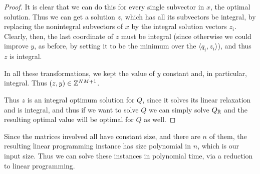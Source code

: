 \begin{proof}
It is clear that we can do this for every single subvector in $x$, the optimal solution. Thus we can get a solution $z$, which has all its subvectors be integral, by replacing the nonintegral subvectors of $x$ by the integral solution vectors $z_i$. Clearly, then, the last coordinate of $z$ must be integral (since otherwise we could improve $y$, as before, by setting it to be the minimum over the $\langle q_i, z_i \rangle$), and thus $z$ is integral.

In all these transformations, we kept the value of $y$ constant and, in particular, integral. Thus $(z, y) \in \mathbb{Z}^{NM+1}$.

Thus $z$ is an integral optimum solution for $Q$, since it solves its linear relaxation and is integral, and thus if we want to solve $Q$ we can simply solve $Q_{\mathbb{R}}$ and the resulting optimal value will be optimal for $Q$ as well.
\end{proof}

Since the matrices involved all have constant size, and there are $n$ of them, the resulting linear programming instance has size polynomial in $n$, which is our input size. Thus we can solve these instances in polynomial time, via a reduction to linear programming.
